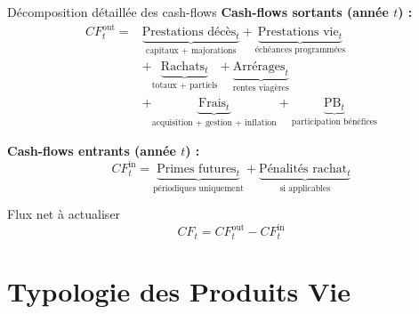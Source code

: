 \documentclass[10pt,aspectratio=169]{beamer}
\newcommand{\PB}{\text{PB}}
\begin{document}
\begin{frame}{Décomposition détaillée des cash-flows}
\textbf{Cash-flows sortants (année $t$) :}
\begin{align*}
CF_t^{\text{out}} = &\underbrace{\text{Prestations décès}_t}_{\text{capitaux + majorations}} 
+ \underbrace{\text{Prestations vie}_t}_{\text{échéances programmées}} \\
&+ \underbrace{\text{Rachats}_t}_{\text{totaux + partiels}} 
+ \underbrace{\text{Arrérages}_t}_{\text{rentes viagères}} \\
&+ \underbrace{\text{Frais}_t}_{\text{acquisition + gestion + inflation}} 
+ \underbrace{\PB_t}_{\text{participation bénéfices}}
\end{align*}

\vspace{0.2cm}
\textbf{Cash-flows entrants (année $t$) :}
\[
CF_t^{\text{in}} = \underbrace{\text{Primes futures}_t}_{\text{périodiques uniquement}} 
+ \underbrace{\text{Pénalités rachat}_t}_{\text{si applicables}}
\]

\vspace{0.2cm}
\begin{exampleblock}{Flux net à actualiser}
\[
\boxed{CF_t = CF_t^{\text{out}} - CF_t^{\text{in}}}
\]
\end{exampleblock}
\end{frame}

\section{Typologie des Produits Vie}
\end{document}
